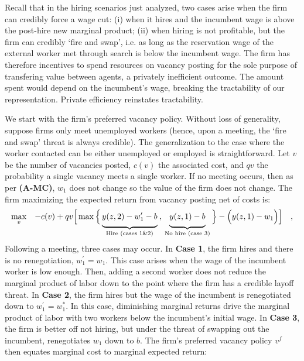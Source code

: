 Recall that in the hiring scenarios just analyzed, two cases arise when the firm can credibly force a wage cut: (i) when it hires and the incumbent wage is above the post-hire new marginal product; (ii) when hiring is not profitable, but the firm can credibly `fire and swap', i.e. as long as the reservation wage of the external worker met through search is below the incumbent wage.
The firm has therefore incentives to spend resources on vacancy posting for the sole purpose of transfering value between agents, a privately inefficient outcome. The amount spent would depend on the incumbent's wage, breaking the tractability of our representation. Private efficiency reinstates tractability.

We start with the firm's preferred vacancy policy.
Without loss of generality, suppose firms only meet unemployed workers (hence, upon a meeting, the `fire and swap' threat is always credible). The generalization to the case where the worker contacted can be either unemployed or employed is straightforward.
Let $v$ be the number of vacancies posted, $c(v)$ the associated cost, and $q v$ the probability a single vacancy meets a single worker.
If no meeting occurs, then as per \textbf{(A-MC)}, $w_1$ does not change so the value of the firm 
does not change.
The firm maximizing the expected return from vacancy posting  net of costs is:
\vspace*{-.3cm}\begin{eqnarray*}
\max_v & & 
- c(v) + qv \Big[\max \Big\{\underbrace{\Big.
y(z,2) - w_1^{\prime} - b\Big.}_{\text{Hire (cases 1\&2)}}
\:,\:
\underbrace{\Big.
y(z,1) - b\Big.}_{\text{No hire (case 3)}}
\Big\} - 
\Big( y(z,1) - w_1 \Big) \Big] \quad, 
\vspace*{-.5cm}\end{eqnarray*}
Following a meeting, three cases may occur.
In \textbf{Case 1}, the firm hires and there is no renegotiation, $w_1^\prime =w_1$. This case arises when the wage of the incumbent worker is low enough. Then, adding a second worker does not reduce the marginal product of labor down to the point where the firm has a credible layoff threat. In \textbf{Case 2}, the firm hires but the wage of the incumbent is renegotiated down to $w_1^\prime =w_1^\ast$. In this case, diminishing marginal returns drive the marginal product of labor with two workers below the incumbent's initial wage. In \textbf{Case 3}, the firm is better off not hiring, but under the threat of swapping out the incumbent, renegotiates $w_1$ down to $b$.
The firm's preferred vacancy policy $v^f$ then equates marginal cost to marginal expected return:

